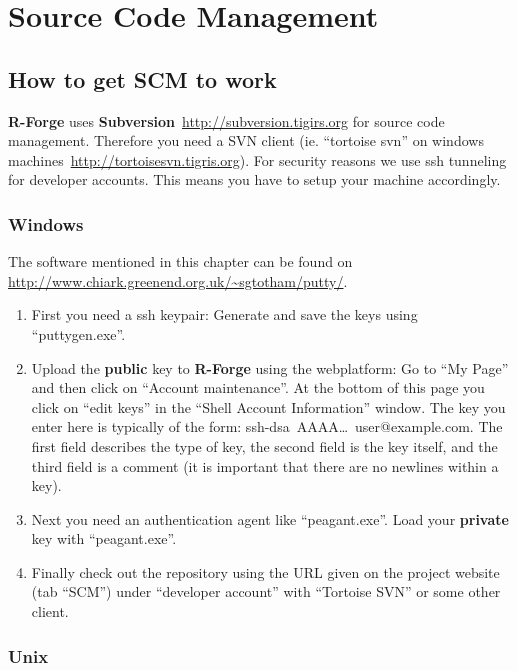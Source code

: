 \documentclass[a4paper]{article}
\begin{document}
\section{Source Code Management}
\label{sec:scm}

\subsection{How to get SCM to work}
\label{sec:scmhowto}

\textbf{R-Forge} uses
\textbf{Subversion}~\url{http://subversion.tigirs.org} for source code
management. Therefore you need a SVN client (ie. ``tortoise svn'' on
windows machines~\url{http://tortoisesvn.tigris.org}). For security
reasons we use ssh tunneling for
developer accounts. This means you have to setup your machine
accordingly.

\subsubsection{Windows}

The software mentioned in this chapter can be found
on \url{http://www.chiark.greenend.org.uk/~sgtotham/putty/}.
\begin{enumerate}
\item First you need a ssh keypair: Generate and save the keys
  using ``puttygen.exe''.  
\item Upload the \textbf{public} key to \textbf{R-Forge} using the webplatform: Go to
  ``My Page'' and then click on ``Account maintenance''. At the bottom
  of this page you click on ``edit keys'' in the ``Shell Account
  Information'' window. The key you enter here is typically of the
  form: ssh-dsa~AAAA\ldots~user@example.com. The first field
  describes the type of key, the second field is the key itself, and
  the third field is a comment (it is important that there are no
  newlines within a key).
\item Next you need an authentication agent like ``peagant.exe''. Load
  your \textbf{private} key with ``peagant.exe''.
\item Finally check out the repository using the URL given on the
  project website (tab ``SCM'') under ``developer account'' with
  ``Tortoise SVN'' or some other client.
\end{enumerate}

\subsubsection{Unix}
\end{document}
